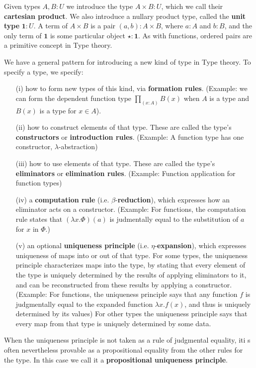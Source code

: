 Given types $A,B:U$ we introduce the type $A\times B:U$, which we call their \textbf{cartesian product}. We also introduce a nullary product type, called the \textbf{unit type} $\mathbf{1}:U$. A term of $A\times B$ is a pair $(a,b) : A\times B$, where $a:A$ and $b:B$, and the only term of $\mathbf{1}$ is some particular object $\star:\mathbf{1}$. As with functions, ordered pairs are a primitive concept in Type theory.

\begin{remark}
    We have a general pattern for introducing a new kind of type in Type theory. To specify a type, we specify: \begin{itemize}
        \item[(i)] how to form new types of this kind, via \textbf{formation rules}. (Example: we can form the dependent function type $\prod_{(x:A)}B(x)$ when $A$ is a type and $B(x)$ is a type for $x \in A$).
        \item[(ii)] how to construct elements of that type. These are called the type's \textbf{constructors} or \textbf{introduction rules}. (Example: A function type has one constructor, $\lambda$-abstraction)
        \item[(iii)] how to use elements of that type. These are called the type's \textbf{eliminators} or \textbf{elimination rules}. (Example: Function application for function types)
        \item[(iv)] a \textbf{computation rule} (i.e. $\beta$-\textbf{reduction}), which expresses how an eliminator acts on a constructor. (Example: For functions, the computation rule states that $(\lambda x.\Phi)(a)$ is judmentally equal to the substitution of $a$ for $x$ in $\Phi$.)
        \item[(v)] an optional \textbf{uniqueness principle} (i.e. $\eta$-\textbf{expansion}), which expresses uniqueness of maps into or out of that type. For some types, the uniqueness principle characterizes maps into the type, by stating that every element of the type is uniquely determined by the results of applying eliminators to it, and can be reconstructed from these results by applying a constructor. (Example: For functions, the uniqueness principle says that any function $f$ is judgmentally equal to the expanded function $\lambda x.f(x)$, and thus is uniquely determined by its values) For other types the uniqueness principle says that every map from that type is uniquely determined by some data.
    \end{itemize}

    When the uniqueness principle is not taken as a rule of judgmental equality, iti s often nevertheless provable as a propositional equality from the other rules for the type. In this case we call it a \textbf{propositional uniqueness principle}.
\end{remark}

